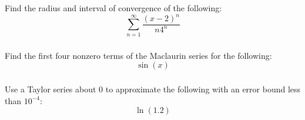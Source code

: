 \documentclass[12pt]{article}
\begin{document}
			\subsubsection{}
				Find the radius and interval of convergence of the following:
				\[\sum_{n=1}^\infty{\frac{(x-2)^n}{n4^n}}\]
			\subsubsection{}
				Find the first four nonzero terms of the Maclaurin series for the following:
				\[\sin\left(x\right)\]
			\subsubsection{}
				Use a Taylor series about 0 to approximate the following with an error bound less than \(10^{-4}\):
				\[\ln(1.2)\]
\end{document}
